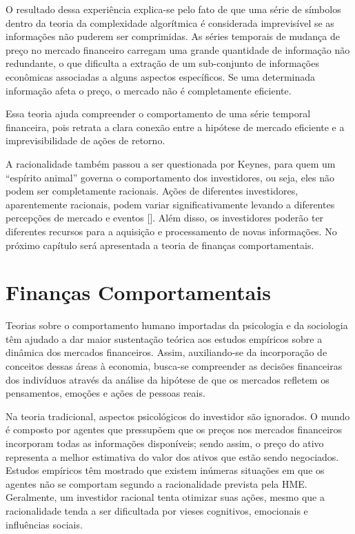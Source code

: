 \documentclass[brazil,ruledheader]{abnt}
\renewcommand{\cite}[1]{[\citeonline{#1}]}
\begin{document}
O resultado dessa experiência explica-se pelo fato de que uma série de
símbolos dentro da teoria da complexidade algorítmica é considerada
imprevisível se as informações não puderem ser comprimidas. As séries
temporais de mudança de preço no mercado financeiro carregam uma
grande quantidade de informação não redundante, o que dificulta a extração de
um sub-conjunto de informações econômicas associadas a alguns
aspectos específicos. Se uma determinada informação afeta o preço, o mercado
não é completamente eficiente.

Essa teoria ajuda compreender o comportamento de uma série temporal
financeira, pois retrata a clara conexão entre a hipótese de mercado eficiente
e a imprevisibilidade de ações de retorno.

A racionalidade também passou a ser questionada por Keynes, para quem um
``espírito animal'' governa o comportamento dos investidores, ou seja, eles
não podem ser completamente racionais. Ações de diferentes
investidores, aparentemente racionais, podem variar significativamente levando
a diferentes percepções de mercado e eventos \cite{Sc05}. Além disso, os
investidores poderão ter diferentes recursos para a aquisição e processamento
de novas informações. No próximo capítulo será apresentada a teoria de
finanças comportamentais.

\section{Finanças Comportamentais}

Teorias sobre o comportamento humano importadas da psicologia e da sociologia
têm ajudado a dar maior sustentação teórica aos estudos empíricos sobre
a dinâmica dos mercados financeiros. Assim, auxiliando-se da incorporação
de conceitos dessas áreas à economia, busca-se compreender as
decisões financeiras dos indivíduos através da análise da hipótese de que
os mercados refletem os pensamentos, emoções e ações de pessoas reais.

Na teoria tradicional, aspectos psicológicos do investidor são ignorados. O
mundo é
composto por agentes que pressupõem que os preços nos mercados
financeiros incorporam todas as informações disponíveis; sendo assim, o preço do
ativo representa a melhor
estimativa do  valor dos ativos que estão sendo negociados. Estudos empíricos
têm mostrado que existem inúmeras situações em que os agentes não se
comportam segundo a racionalidade prevista pela HME. Geralmente, um
investidor racional tenta otimizar suas ações, mesmo que a racionalidade tenda
a ser dificultada por vieses cognitivos, emocionais e influências sociais.
\end{document}
